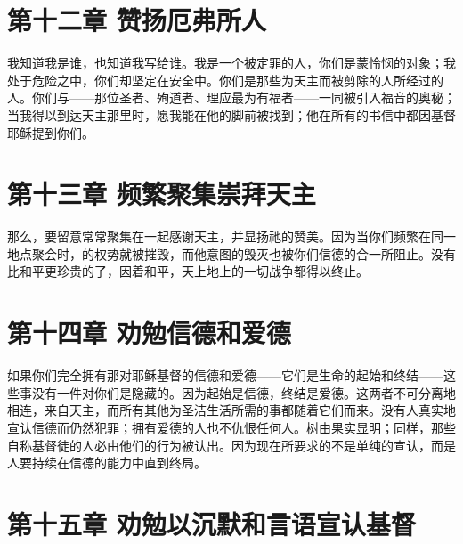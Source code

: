 
\section{第十二章 赞扬厄弗所人}

我知道我是谁，也知道我写给谁。我是一个被定罪的人，你们是蒙怜悯的对象；我处于危险之中，你们却坚定在安全中。你们是那些为天主而被剪除的人所经过的人。你们与——那位圣者、殉道者、理应最为有福者——一同被引入福音的奥秘；当我得以到达天主那里时，愿我能在他的脚前被找到；他在所有的书信中都因基督耶稣提到你们。\par


\section{第十三章 频繁聚集崇拜天主}

那么，要留意常常聚集在一起感谢天主，并显扬祂的赞美。因为当你们频繁在同一地点聚会时，的权势就被摧毁，而他意图的毁灭也被你们信德的合一所阻止。没有比和平更珍贵的了，因着和平，天上地上的一切战争都得以终止。\par


\section{第十四章 劝勉信德和爱德}

如果你们完全拥有那对耶稣基督的信德和爱德——它们是生命的起始和终结——这些事没有一件对你们是隐藏的。因为起始是信德，终结是爱德。这两者不可分离地相连，来自天主，而所有其他为圣洁生活所需的事都随着它们而来。没有人真实地宣认信德而仍然犯罪；拥有爱德的人也不仇恨任何人。树由果实显明；同样，那些自称基督徒的人必由他们的行为被认出。因为现在所要求的不是单纯的宣认，而是人要持续在信德的能力中直到终局。\par


\section{第十五章 劝勉以沉默和言语宣认基督}

